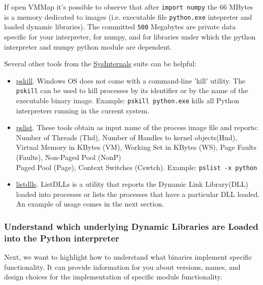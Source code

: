 \documentclass[
]{article}
\begin{document}
If open VMMap it's possible to observe that after \texttt{import\ numpy}
the 66 MBytes is a memory dedicated to images (i.e. executable file
\texttt{python.exe} intepreter and loaded dynamic libraries). The
committed \texttt{500} Megabytes are private data specific for your
interpreter, for numpy, and for libraries under which the python
interpreter and numpy python module are dependent.

Several other tools from the
\href{https://learn.microsoft.com/en-us/sysinternals/}{SysInternals}
suite can be helpful:

\begin{itemize}
\item
  \href{https://learn.microsoft.com/en-us/sysinternals/downloads/pskill}{pskill}.
  Windows OS does not come with a command-line 'kill' utility. The
  \texttt{pskill} can be used to kill processes by its identifier or by
  the name of the executable binary image. Example:
  \texttt{pskill\ python.exe} kills all Python interpreters running in
  the current system.
\item
  \href{https://learn.microsoft.com/en-us/sysinternals/downloads/pslist}{pslist}.
  These tools obtain as input name of the process image file and
  reports:\\
  Number of Threads (Thd), Number of Handles to kernel objects(Hnd),
  Virtual Memory in KBytes (VM), Working Set in KBytes (WS), Page Faults
  (Faults), Non-Paged Pool (NonP)\\
  Paged Pool (Page), Context Switches (Cswtch). Example:
  \texttt{pslist\ -x\ python}
\item
  \href{https://learn.microsoft.com/en-us/sysinternals/downloads/listdlls}{listdlls}.
  ListDLLs is a utility that reports the Dynamic Link Library(DLL)
  loaded into processes or lists the processes that have a particular
  DLL loaded. An example of usage comes in the next section.
\end{itemize}

\hypertarget{understand-which-underlying-dynamic-libraries-are-loaded-into-the-python-interpreter}{%
\subsubsection{Understand which underlying Dynamic Libraries are Loaded
into the Python
interpreter}\label{understand-which-underlying-dynamic-libraries-are-loaded-into-the-python-interpreter}}

Next, we want to highlight how to understand what binaries implement
specific functionality. It can provide information for you about
versions, names, and design choices for the implementation of specific
module functionality.
\end{document}
